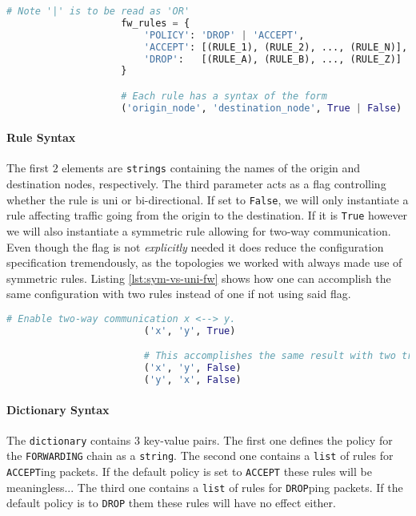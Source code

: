                 \begin{lstlisting}[language = python, caption = Syntax for specifying firewall rules., label = lst:fw-dict-syntax]
                    # Note '|' is to be read as 'OR'
                    fw_rules = {
                        'POLICY': 'DROP' | 'ACCEPT',
                        'ACCEPT': [(RULE_1), (RULE_2), ..., (RULE_N)],
                        'DROP':   [(RULE_A), (RULE_B), ..., (RULE_Z)]
                    }

                    # Each rule has a syntax of the form
                    ('origin_node', 'destination_node', True | False)
                \end{lstlisting}

                \paragraph{Rule Syntax}
                    The first $2$ elements are \texttt{strings} containing the names of the origin and destination nodes, respectively. The third parameter acts as a flag controlling whether the rule is uni or bi-directional. If set to \texttt{False}, we will only instantiate a rule affecting traffic going from the origin to the destination. If it is \texttt{True} however we will also instantiate a symmetric rule allowing for two-way communication. Even though the flag is not \textit{explicitly} needed it does reduce the configuration specification tremendously, as the topologies we worked with always made use of symmetric rules. Listing \ref{lst:sym-vs-uni-fw} shows how one can accomplish the same configuration with two rules instead of one if not using said flag.\\

                    \begin{lstlisting}[language = python, caption = Uni-directional vs. symmetric firewall rules., label = lst:sym-vs-uni-fw]
                        # Enable two-way communication x <--> y.
                        ('x', 'y', True)

                        # This accomplishes the same result with two triplets.
                        ('x', 'y', False)
                        ('y', 'x', False)
                    \end{lstlisting}

                \paragraph{Dictionary Syntax}
                    The \texttt{dictionary} contains $3$ key-value pairs. The first one defines the policy for the \texttt{FORWARDING} chain as a \texttt{string}. The second one contains a \texttt{list} of rules for \texttt{ACCEPT}ing packets. If the default policy is set to \texttt{ACCEPT} these rules will be meaningless... The third one contains a \texttt{list} of rules for \texttt{DROP}ping packets. If the default policy is to \texttt{DROP} them these rules will have no effect either.\\


